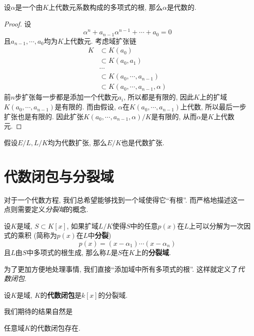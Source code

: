 \begin{thm}\label{algcoef}
    设$\alpha$是一个由$K$上代数元系数构成的多项式的根, 那么$\alpha$是代数的.
\end{thm}
\begin{proof}
    设
    \[\alpha^n+a_{n-1}\alpha^{n-1}+\cdots+a_0=0\]
    且$a_{n-1},\cdots,a_0$均为$K$上代数元.
    考虑域扩张链
    \begin{align*}
        K&\subset K(a_0)\\
        &\subset K(a_0,a_1)\\
        &\cdots\\
        &\subset K(a_0,\cdots,a_{n-1})\\
        &\subset K(a_0,\cdots,a_{n-1},\alpha)
    \end{align*}
    前$n$步扩张每一步都是添加一个代数元$a_i$, 所以都是有限的, 因此$K$上的扩域$K(a_0,\cdots,a_{n-1})$是有限的.
    而由假设, $\alpha$在$K(a_0,\cdots,a_{n-1})$上代数, 所以最后一步扩张也是有限的.
    因此扩张$K(a_0,\cdots,a_{n-1},\alpha)/K$是有限的, 从而$\alpha$是$K$上代数元.
\end{proof}

\begin{col}\label{alg of alg}
    假设$E/L,L/K$均为代数扩张, 那么$E/K$也是代数扩张.
\end{col}

\section{代数闭包与分裂域}

对于一个代数方程, 我们总希望能够找到一个域使得它``有根''.
而严格地描述这一点则需要定义\textit{分裂域}的概念.

\begin{defn}
    设$K$是域, $S\subset K[x]$, 如果扩域$L/K$使得$S$中的任意$p(x)$在$L$上可以分解为一次因式的乘积 (简称为$p(x)$在$L$中\textbf{分裂})
    \[p(x)=(x-\alpha_1)\cdots(x-\alpha_n)\]
    且$L$由$S$中多项式的根生成, 那么称$L$是$S$在$K$上的\textbf{分裂域}.
\end{defn}

为了更加方便地处理事情, 我们直接``添加域中所有多项式的根''.
这样就定义了\textit{代数闭包}.

\begin{defn}
    设$K$是域, $K$的\textbf{代数闭包}是$k[x]$的分裂域.
\end{defn}

我们期待的结果自然是
\begin{prop}\label{alg closure}
    任意域$K$的代数闭包存在.
\end{prop}

